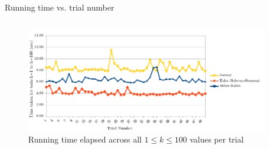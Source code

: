 \documentclass[pdf]{beamer}
\begin{document}
\begin{frame}{Running time vs. trial number}
    \begin{columns}[t, onlytextwidth]
        \begin{column}{0.65\textwidth}
            \begin{figure}[h!]
                \caption{Running time elapsed across all $1 \leq k \leq 100$ values per trial}
                \label{fig:time_v_trial}
                \centering
                \includegraphics[width=\textwidth]{time_v_trial}
            \end{figure}
        \end{column}
        \begin{column}{0.35\textwidth}
            \fontsize{8}{9}\selectfont
            \begin{outline}
            \end{outline}
        \end{column}
    \end{columns}
\end{frame}
\end{document}
